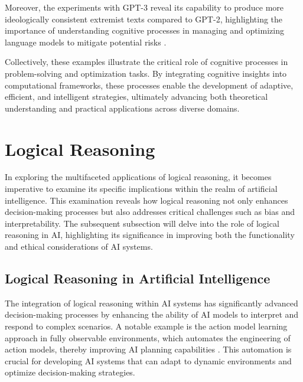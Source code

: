 Moreover, the experiments with GPT-3 reveal its capability to produce more ideologically consistent extremist texts compared to GPT-2, highlighting the importance of understanding cognitive processes in managing and optimizing language models to mitigate potential risks \cite{mcguffie2020radicalizationrisksgpt3advanced}.



Collectively, these examples illustrate the critical role of cognitive processes in problem-solving and optimization tasks. By integrating cognitive insights into computational frameworks, these processes enable the development of adaptive, efficient, and intelligent strategies, ultimately advancing both theoretical understanding and practical applications across diverse domains.












\section{Logical Reasoning} \label{sec:Logical Reasoning}

In exploring the multifaceted applications of logical reasoning, it becomes imperative to examine its specific implications within the realm of artificial intelligence. This examination reveals how logical reasoning not only enhances decision-making processes but also addresses critical challenges such as bias and interpretability. The subsequent subsection will delve into the role of logical reasoning in AI, highlighting its significance in improving both the functionality and ethical considerations of AI systems.






\subsection{Logical Reasoning in Artificial Intelligence} \label{subsec:Logical Reasoning in Artificial Intelligence}

The integration of logical reasoning within AI systems has significantly advanced decision-making processes by enhancing the ability of AI models to interpret and respond to complex scenarios. A notable example is the action model learning approach in fully observable environments, which automates the engineering of action models, thereby improving AI planning capabilities \cite{aineto2024actionmodellearningguarantees}. This automation is crucial for developing AI systems that can adapt to dynamic environments and optimize decision-making strategies.

